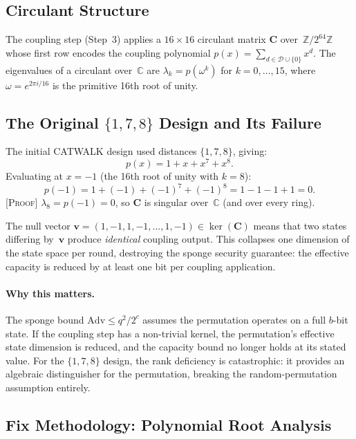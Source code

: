 \documentclass[runningheads]{llncs}
\newcommand{\proof}[1]{\textsc{[Proof]} #1}
\newcommand{\Ztwo}{\mathbb{Z}/2^{64}\mathbb{Z}}
\newcommand{\coupmat}{\mathbf{C}}
\begin{document}
\subsection{Circulant Structure}

The coupling step (Step~3) applies a $16 \times 16$ circulant matrix $\coupmat$
over~$\Ztwo$ whose first row encodes the coupling polynomial
$p(x) = \sum_{d \in \mathcal{D} \cup \{0\}} x^d$.
The eigenvalues of a circulant over~$\mathbb{C}$ are
$\lambda_k = p(\omega^k)$ for $k = 0, \ldots, 15$,
where $\omega = e^{2\pi i/16}$ is the primitive 16th root of unity.

\subsection{The Original \texorpdfstring{$\{1,7,8\}$}{1,7,8} Design and Its Failure}

The initial CATWALK design used distances $\{1,7,8\}$, giving:
\[
  p(x) = 1 + x + x^7 + x^8.
\]
Evaluating at $x = -1$ (the 16th root of unity with $k = 8$):
\[
  p(-1) = 1 + (-1) + (-1)^7 + (-1)^8 = 1 - 1 - 1 + 1 = 0.
\]
\proof{$\lambda_8 = p(-1) = 0$, so $\coupmat$ is singular over~$\mathbb{C}$ (and over every ring).}

The null vector $\mathbf{v} = (1, -1, 1, -1, \ldots, 1, -1) \in \ker(\coupmat)$
means that two states differing by~$\mathbf{v}$ produce \emph{identical} coupling
output.  This collapses one dimension of the state space per round, destroying
the sponge security guarantee: the effective capacity is reduced by at least
one bit per coupling application.

\paragraph{Why this matters.}
The sponge bound $\mathrm{Adv} \leq q^2/2^c$ assumes the permutation operates
on a full $b$-bit state.  If the coupling step has a non-trivial kernel, the
permutation's effective state dimension is reduced, and the capacity bound no
longer holds at its stated value.  For the $\{1,7,8\}$ design, the rank
deficiency is catastrophic: it provides an algebraic distinguisher for the
permutation, breaking the random-permutation assumption entirely.

\subsection{Fix Methodology: Polynomial Root Analysis}
\end{document}

